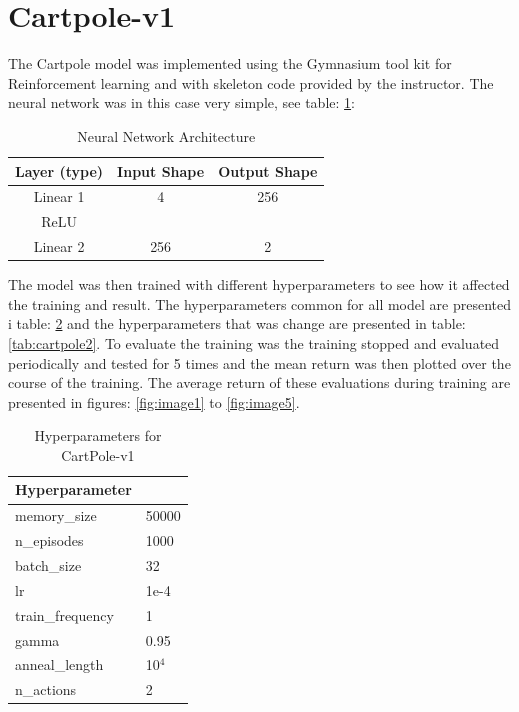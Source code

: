 \documentclass[a4paper,10pt]{article}
\begin{document}
\section{Cartpole-v1}
The Cartpole model was implemented using the Gymnasium tool kit for Reinforcement learning and with skeleton code provided by the instructor. The neural network was in this case very simple, see table: \ref{tab:polearc}:
\newpage

\begin{table}[h]
\centering
\begin{tabular}{|c|c|c|}
\hline
\textbf{Layer (type)} & \textbf{Input Shape} & \textbf{Output Shape} \\
\hline
Linear 1 & 4 & 256 \\
\hline
ReLU &  &  \\
\hline
Linear 2 & 256 & 2 \\
\hline
\end{tabular}
\caption{Neural Network Architecture}
\label{tab:polearc}
\end{table}

The model was then trained with different hyperparameters to see how it affected the training and result. The hyperparameters common for all model are presented i table: \ref{tab:cartpole1} and the hyperparameters that was change are presented in table: \ref{tab:cartpole2}. To evaluate the training was the training stopped and evaluated periodically and tested for 5 times and the mean return was then plotted over the course of the training. The average return of these evaluations during training are presented in figures: \ref{fig:image1} to \ref{fig:image5}. 



\begin{table}[ht]
\centering
\begin{tabular}{|l|l|}
\hline
\textbf{Hyperparameter} & \\
\hline
memory\_size & 50000 \\
n\_episodes & 1000 \\
batch\_size & 32  \\
lr & 1e-4 \\
train\_frequency & 1\\
gamma & 0.95  \\
anneal\_length & 10$^4$ \\
n\_actions & 2 \\
\hline
\end{tabular}
\caption{Hyperparameters for CartPole-v1}
\label{tab:cartpole1}
\end{table}
\end{document}
